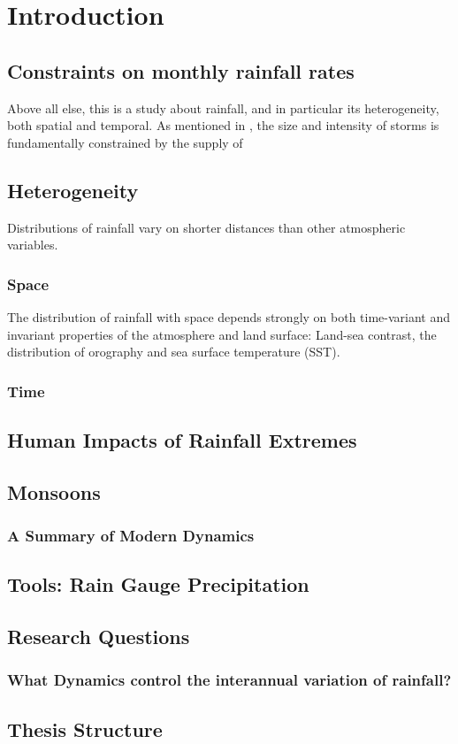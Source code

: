 \chapter{Introduction}

\section{Constraints on monthly rainfall rates}
Above all else, this is a study about rainfall, and in particular its heterogeneity, both spatial and temporal. As mentioned in \cite{Trenberth}, the size and intensity of storms is fundamentally constrained by the supply of 

\section{Heterogeneity}
Distributions of rainfall vary on shorter distances than other atmospheric variables.

\subsection{Space}
The distribution of rainfall with space depends strongly on both time-variant and invariant properties of the atmosphere and land surface: Land-sea contrast, the distribution of orography and sea surface temperature (SST).

\subsection{Time}
\section{Human Impacts of Rainfall Extremes}
\section{Monsoons}
\subsection{A Summary of Modern Dynamics}

\section{Tools: Rain Gauge Precipitation}

\section{Research Questions}

\subsection{What Dynamics control the interannual variation of rainfall?}

\section{Thesis Structure}